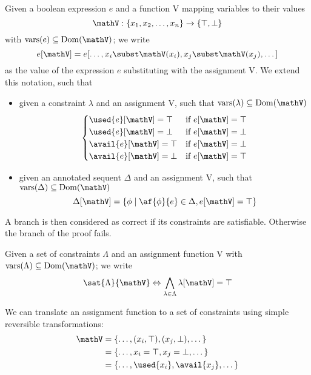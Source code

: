 \begin{define}[Evaluation]
	Given a boolean expression $e$ and a function V mapping variables to their values 
	$$ \mathV : \{ x_1, x_2, \dots, x_n \} \rightarrow \{ \top, \bot \} $$
	with $\mathrm{vars}(e) \subseteq \mathrm{Dom}(\mathV)$; we write
		$$ e[\mathV] = e[\dots, x_i \subst \mathV(x_i), x_j \subst \mathV(x_j), \dots] $$
	as the value of the expression $e$ substituting with the assignment V.
	We extend this notation, such that
	\begin{itemize}
		\item given a constraint $\lambda$ and an assignment V, such that $\mathrm{vars}(\lambda) \subseteq \mathrm{Dom}(\mathV)$
			$$ 
			\begin{cases} 
				\used{e}[\mathV] = \top & \text{if } e[\mathV] = \top \\
				\used{e}[\mathV] = \bot & \text{if } e[\mathV] = \bot \\
				\avail{e}[\mathV] = \top & \text{if } e[\mathV] = \bot \\
				\avail{e}[\mathV] = \bot & \text{if } e[\mathV] = \top \\
			\end{cases}
			$$
		\item given an annotated sequent $\Delta$ and an assignment V, such that $\mathrm{vars}(\Delta) \subseteq \mathrm{Dom}(\mathV)$
			$$ \Delta[\mathV] = \{ \phi \mid \af{\phi}{e} \in \Delta , e[\mathV] = \top \} $$
	\end{itemize}
\end{define}
A branch is then considered as correct if its constraints are satisfiable.
Otherwise the branch of the proof fails.
\begin{define}
	\label{def:sat}
	Given a set of constraints $\Lambda$ and an assignment function V with $\mathrm{vars}(\Lambda) \subseteq \mathrm{Dom}(\mathV)$; we write 
	$$ \sat{\Lambda}{\mathV} \Leftrightarrow \bigwedge_{\lambda \in \Lambda} \lambda[\mathV] = \top $$
\end{define}
\begin{fact}
	\label{fact:ass-trans}
	We can translate an assignment function to a set of constraints using simple reversible transformations:
	\begin{align*}
		\mathV &= \{ \dots, (x_i, \top), (x_j, \bot), \dots \} \\
		       &= \{ \dots, x_i = \top, x_j = \bot, \dots \} \\
		       &= \{ \dots, \used{x_i}, \avail{x_j}, \dots \}
	\end{align*}
\end{fact}

